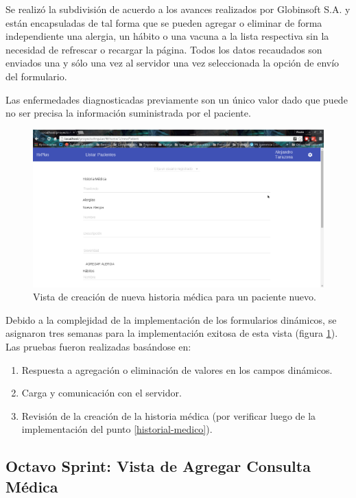     Se realizó la subdivisión de acuerdo a los avances realizados por Globinsoft S.A. y están encapsuladas de tal forma que se pueden agregar o eliminar de forma independiente una alergia, un hábito o una vacuna a la lista respectiva sin la necesidad de refrescar o recargar la página. Todos los datos recaudados son enviados una y sólo una vez al servidor una vez seleccionada la opción de envío del formulario.
    
    Las enfermedades diagnosticadas previamente son un único valor dado que puede no ser precisa la información suministrada por el paciente.
    
    \begin{figure}[htbp!]
        \begin{center}
            \includegraphics[width=.9\textwidth]{figures/p10}
        \end{center}
        \caption{Vista de creación de nueva historia médica para un paciente nuevo.}
        \label{creación}
    \end{figure}
    
    Debido a la complejidad de la implementación de los formularios dinámicos, se asignaron tres semanas para la implementación exitosa de esta vista (figura \ref{creación}). Las pruebas fueron realizadas basándose en:
    
    \begin{enumerate}
        \item Respuesta a agregación o eliminación de valores en los campos dinámicos.
        \item Carga y comunicación con el servidor.
        \item Revisión de la creación de la historia médica (por verificar luego de la implementación del punto \ref{historial-medico}).
    \end{enumerate}

    \subsection{Octavo Sprint: Vista de Agregar Consulta Médica}
    \label{crear-consulta}
    
